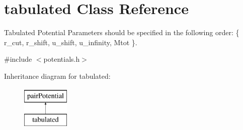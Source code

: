 \hypertarget{classtabulated}{\section{tabulated Class Reference}
\label{classtabulated}
}


Tabulated Potential Parameters should be specified in the following order\-: \{ r\-\_\-cut, r\-\_\-shift, u\-\_\-shift, u\-\_\-infinity, Mtot \}.  




{\ttfamily \#include $<$potentials.\-h$>$}

Inheritance diagram for tabulated\-:\begin{figure}[H]
\begin{center}
\leavevmode
\includegraphics[height=2.000000cm]{classtabulated}
\end{center}
\end{figure}
